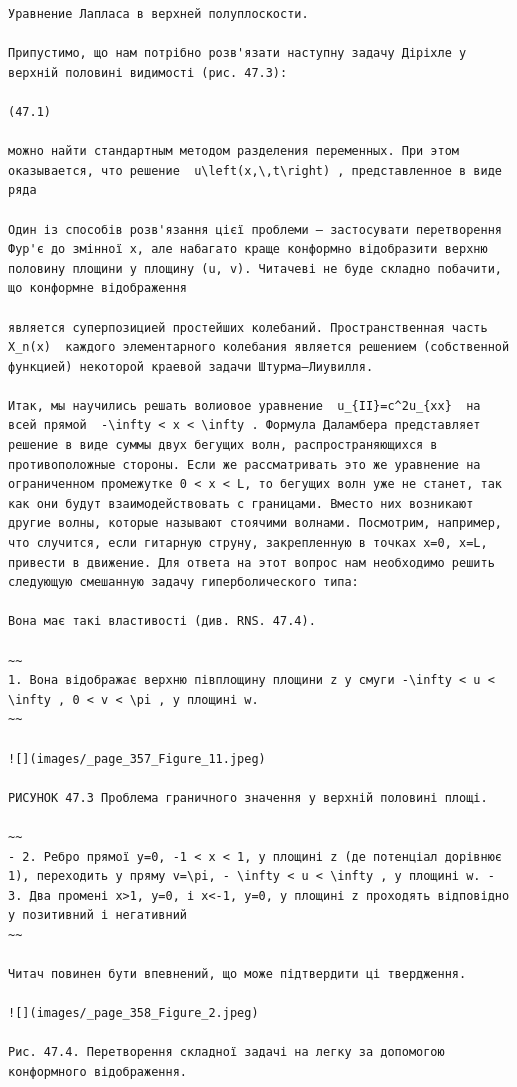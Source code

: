 \documentclass[
  ukrainian,
]{article}
\begin{document}
\begin{verbatim}
Уравнение Лапласа в верхней полуплоскости.

Припустимо, що нам потрібно розв'язати наступну задачу Діріхле у верхній половині видимості (рис. 47.3):

(47.1)

можно найти стандартным методом разделения переменных. При этом оказывается, что решение  u\left(x,\,t\right) , представленное в виде ряда

Один із способів розв'язання цієї проблеми — застосувати перетворення Фур'є до змінної x, але набагато краще конформно відобразити верхню половину площини у площину (u, v). Читачеві не буде складно побачити, що конформне відображення

является суперпозицией простейших колебаний. Пространственная часть  X_n(x)  каждого элементарного колебания является решением (собственной функцией) некоторой краевой задачи Штурма—Лиувилля.

Итак, мы научились решать волиовое уравнение  u_{II}=c^2u_{xx}  на всей прямой  -\infty < x < \infty . Формула Даламбера представляет решение в виде суммы двух бегущих волн, распространяющихся в противоположные стороны. Если же рассматривать это же уравнение на ограниченном промежутке 0 < x < L, то бегущих волн уже не станет, так как они будут взаимодействовать с границами. Вместо них возникают другие волны, которые называют стоячими волнами. Посмотрим, например, что случится, если гитарную струну, закрепленную в точках x=0, x=L, привести в движение. Для ответа на этот вопрос нам необходимо решить следующую смешанную задачу гиперболического типа:

Вона має такі властивості (див. RNS. 47.4).

~~
1. Вона відображає верхню півплощину площини z у смуги -\infty < u < \infty , 0 < v < \pi , у площині w.
~~

![](images/_page_357_Figure_11.jpeg)

РИСУНОК 47.3 Проблема граничного значення у верхній половині площі.

~~
- 2. Ребро прямої y=0, -1 < x < 1, у площині z (де потенціал дорівнює 1), переходить у пряму v=\pi, - \infty < u < \infty , у площині w. - 3. Два промені x>1, y=0, і x<-1, y=0, у площині z проходять відповідно у позитивний і негативний
~~

Читач повинен бути впевнений, що може підтвердити ці твердження.

![](images/_page_358_Figure_2.jpeg)

Рис. 47.4. Перетворення складної задачі на легку за допомогою конформного відображення.


\end{verbatim}
\end{document}

